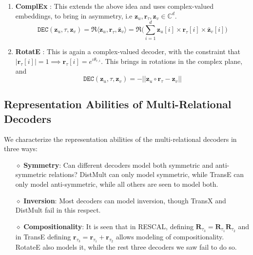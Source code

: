 \begin{enumerate}
\begin{enumerate}
\item \textbf{ComplEx} \cite{complex}: This extends the above idea and uses complex-valued embeddings, to bring in asymmetry, i.e $\mathbf{z}_u, \mathbf{r}_\tau, \mathbf{z}_v \in \mathbb{C}^d$.
 \begin{equation}
	\texttt{DEC}(\mathbf{z}_u, \tau, \mathbf{z}_v) = \Re\langle \mathbf{z}_u, \mathbf{r}_\tau, \bar{\mathbf{z}}_v \rangle =\Re\bigg( \sum_{i=1}^d \mathbf{z}_u[i] \times \mathbf{r}_\tau[i] \times \bar{\mathbf{z}}_v[i]\bigg)
\end{equation}
\item \textbf{RotatE} \cite{rotate}: This is again a complex-valued decoder, with the constraint that $|\mathbf{r}_\tau[i]| = 1 \implies \mathbf{r}_\tau[i] =e^{\iota \theta_{r, i}}$. This brings in rotations in the complex plane, and 
\begin{equation}
	\texttt{DEC}(\mathbf{z}_u, \tau, \mathbf{z}_v) = - || \mathbf{z}_u \circ \mathbf{r}_\tau - \mathbf{z}_v||
\end{equation}
\end{enumerate}
\end{enumerate}
\subsection{Representation Abilities of Multi-Relational Decoders}
We characterize the representation abilities of the multi-relational decoders in three ways:
\begin{itemize}
	\item[$\diamond$] \textbf{Symmetry}: Can different decoders model both symmetric and anti-symmetric relations? DistMult can only model symmetric, while TransE can only model anti-symmetric, while all others are seen to model both.
	\item[$\diamond$] \textbf{Inversion}: Most decoders can model inversion, though TransX and DistMult fail in this respect.
	\item[$\diamond$] \textbf{Compositionality}: It is seen that in RESCAL, defining $\mathbf{R}_{\tau_3} = \mathbf{R}_{\tau_1}\mathbf{R}_{\tau_2}$ and in TransE defining $\mathbf{r}_{\tau_3} = \mathbf{r}_{\tau_1} + \mathbf{r}_{\tau_2}$ allows modeling of compositionality. RotateE also models it, while the rest three decoders we saw fail to do so.
\end{itemize}